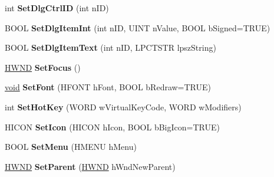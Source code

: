 \begin{DoxyCompactItemize}
\item 
\mbox{\label{class_a_t_l_1_1_c_window_aa6bdcade6f1207e469619a106721e2ce}} 
int {\bfseries Set\+Dlg\+Ctrl\+ID} (int n\+ID)
\item 
\mbox{\label{class_a_t_l_1_1_c_window_a58e22d4c46325323762d5e51233050d5}} 
B\+O\+OL {\bfseries Set\+Dlg\+Item\+Int} (int n\+ID, U\+I\+NT n\+Value, B\+O\+OL b\+Signed=T\+R\+UE)
\item 
\mbox{\label{class_a_t_l_1_1_c_window_a2baded1ef762f8e35a2e2bb8470fcd46}} 
B\+O\+OL {\bfseries Set\+Dlg\+Item\+Text} (int n\+ID, L\+P\+C\+T\+S\+TR lpsz\+String)
\item 
\mbox{\label{class_a_t_l_1_1_c_window_a4769b0ce7180cb3c003feeb54e0cb042}} 
\hyperlink{interfacevoid}{H\+W\+ND} {\bfseries Set\+Focus} ()
\item 
\mbox{\label{class_a_t_l_1_1_c_window_a5d0f7cf59f12e6f7ed62cd3d86841033}} 
\hyperlink{interfacevoid}{void} {\bfseries Set\+Font} (H\+F\+O\+NT h\+Font, B\+O\+OL b\+Redraw=T\+R\+UE)
\item 
\mbox{\label{class_a_t_l_1_1_c_window_a40c71b3f1122492db2ef35d8f7c236d8}} 
int {\bfseries Set\+Hot\+Key} (W\+O\+RD w\+Virtual\+Key\+Code, W\+O\+RD w\+Modifiers)
\item 
\mbox{\label{class_a_t_l_1_1_c_window_a5c0f052d28a312b8a26b664c25daef2a}} 
H\+I\+C\+ON {\bfseries Set\+Icon} (H\+I\+C\+ON h\+Icon, B\+O\+OL b\+Big\+Icon=T\+R\+UE)
\item 
\mbox{\label{class_a_t_l_1_1_c_window_a846d3e058f59de9c9e66ce892a50cd82}} 
B\+O\+OL {\bfseries Set\+Menu} (H\+M\+E\+NU h\+Menu)
\item 
\mbox{\label{class_a_t_l_1_1_c_window_a01631735d4b92d96a7ff605a43d94668}} 
\hyperlink{interfacevoid}{H\+W\+ND} {\bfseries Set\+Parent} (\hyperlink{interfacevoid}{H\+W\+ND} h\+Wnd\+New\+Parent)
\item 
\mbox{\label{class_a_t_l_1_1_c_window_a5efd25c59c4089a539dc9098e6ed5e91}} 

\end{DoxyCompactItemize}
